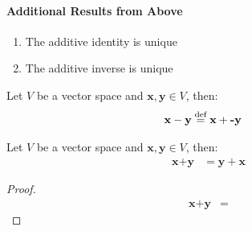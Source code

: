 \documentclass[11pt]{article}
\begin{document}
\paragraph{Additional Results from Above}
\begin{enumerate}
    \item The additive identity is unique
    \item The additive inverse is unique
\end{enumerate}
\begin{definition}[Subtraction]
    Let $V$ be a vector space and $\textbf{x}, \textbf{y} \in V$, then:
    \begin{align*}
        \textbf{x} - \textbf{y} &\stackrel{\text{def}}{=} \textbf{x} + \textbf{-y}
    \end{align*}
\end{definition}
\begin{theorem}
    Let $V$ be a vector space and $\textbf{x}, \textbf{y} \in V$, then:
    \begin{align*}
        \textbf{x} + \textbf{y} &= \textbf{y} + \textbf{x}
    \end{align*} 
\end{theorem}
\begin{proof}
    \begin{align*}
        \textbf{x} + \textbf{y} &=  
    \end{align*}
\end{proof} 
\end{document}
